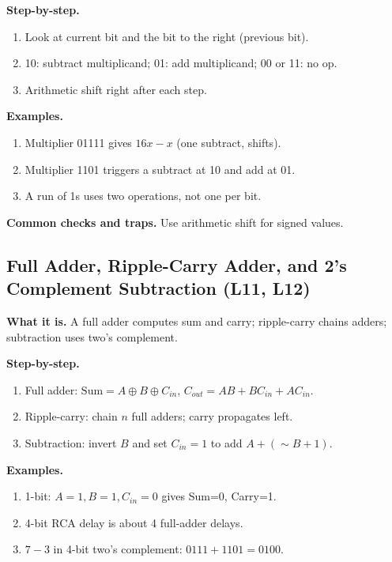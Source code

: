 \documentclass[11pt]{article}
\begin{document}
\textbf{Step-by-step.}
\begin{enumerate}[leftmargin=*]
  \item Look at current bit and the bit to the right (previous bit).
  \item 10: subtract multiplicand; 01: add multiplicand; 00 or 11: no op.
  \item Arithmetic shift right after each step.
\end{enumerate}

\textbf{Examples.}
\begin{enumerate}[leftmargin=*]
  \item Multiplier 01111 gives $16x - x$ (one subtract, shifts).
  \item Multiplier 1101 triggers a subtract at 10 and add at 01.
  \item A run of 1s uses two operations, not one per bit.
\end{enumerate}

\textbf{Common checks and traps.} Use arithmetic shift for signed values.

\begin{figure}[h]
\centering
{}
\end{figure}

\subsection{Full Adder, Ripple-Carry Adder, and 2's Complement Subtraction (L11, L12)}
\textbf{What it is.} A full adder computes sum and carry; ripple-carry chains adders; subtraction uses two's complement.

\textbf{Step-by-step.}
\begin{enumerate}[leftmargin=*]
  \item Full adder: $\text{Sum}=A\oplus B\oplus C_{in}$, $C_{out}=AB+BC_{in}+AC_{in}$.
  \item Ripple-carry: chain $n$ full adders; carry propagates left.
  \item Subtraction: invert $B$ and set $C_{in}=1$ to add $A + (\sim B + 1)$.
\end{enumerate}

\textbf{Examples.}
\begin{enumerate}[leftmargin=*]
  \item 1-bit: $A=1, B=1, C_{in}=0$ gives Sum=0, Carry=1.
  \item 4-bit RCA delay is about 4 full-adder delays.
  \item $7-3$ in 4-bit two's complement: $0111 + 1101 = 0100$.
\end{enumerate}
\end{document}

